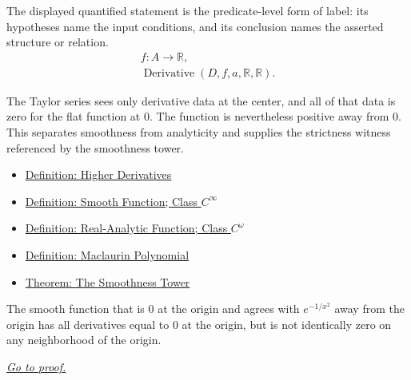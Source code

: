 \begin{remark*}
The displayed quantified statement is the predicate-level form of label: its hypotheses name the input conditions, and its conclusion names the asserted structure or relation.
\[
\begin{aligned}
  f\colon A\to\mathbb{R},\\
  \operatorname{Derivative}(D,f,a,\mathbb{R},\mathbb{R}).
\end{aligned}
\]
\end{remark*}

\begin{remark*}[Interpretation]
The Taylor series sees only derivative data at the center, and all of that data is zero for the flat function at \(0\). The function is nevertheless positive away from \(0\). This separates smoothness from analyticity and supplies the strictness witness referenced by the smoothness tower.
\end{remark*}

\begin{dependencies}
\begin{itemize}
  \item \hyperref[def:higher-derivatives]{Definition: Higher Derivatives}
  \item \hyperref[def:class-cinfty]{Definition: Smooth Function; Class \(C^\infty\)}
  \item \hyperref[def:class-comega]{Definition: Real-Analytic Function; Class \(C^\omega\)}
  \item \hyperref[def:maclaurin-polynomial]{Definition: Maclaurin Polynomial}
  \item \hyperref[thm:smoothness-tower]{Theorem: The Smoothness Tower}
\end{itemize}
\end{dependencies}

\begin{theorem}
\label{thm:flat-function-properties}
The smooth function that is $0$ at the origin and agrees with $e^{-1/x^2}$ away from the origin has all derivatives equal to $0$ at the origin, but is not identically zero on any neighborhood of the origin.

\smallskip
\noindent
\hyperref[prf:flat-function-properties]{\textit{Go to proof.}}
\end{theorem}

